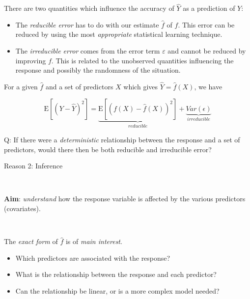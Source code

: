\documentclass[ignorenonframetext,]{beamer}
\providecommand{\tightlist}{%
  \setlength{\itemsep}{0pt}\setlength{\parskip}{0pt}}
\begin{document}
\begin{frame}

There are two quantities which influence the accuracy of \(\hat{Y}\) as
a prediction of \(Y\):

\begin{itemize}
\tightlist
\item
  The \emph{reducible error} has to do with our estimate \(\hat{f}\) of
  \(f\). This error can be reduced by using the most \emph{appropriate}
  statistical learning technique.
\item
  The \emph{irreducible error} comes from the error term \(\varepsilon\)
  and cannot be reduced by improving \(f\). This is related to the
  unobserved quantities influencing the response and possibly the
  randomness of the situation.
\end{itemize}

For a given \(\hat{f}\) and a set of predictors \(X\) which gives
\(\hat{Y}=\hat{f}(X)\), we have

\[\text{E}[(Y-\hat{Y})^2] = \underbrace{\text{E}[(f(X)-\hat{f}(X))^2]}_{reducible} + \underbrace{Var(\epsilon)}_{irreducible}\]

\end{frame}

\begin{frame}

\begin{block}{Q: If there were a \emph{deterministic} relationship
between the response and a set of predictors, would there then be both
reducible and irreducible error?}

\end{block}

\end{frame}

\begin{frame}

\begin{block}{Reason 2: Inference}

\(~\)

\textbf{Aim}: \emph{understand} how the response variable is affected by
the various predictors (covariates).

\(~\)

The \emph{exact form} of \(\hat{f}\) is of \emph{main interest}.

\begin{itemize}
\tightlist
\item
  Which predictors are associated with the response?
\item
  What is the relationship between the response and each predictor?
\item
  Can the relationship be linear, or is a more complex model needed?
\end{itemize}

\end{block}

\end{frame}
\end{document}
